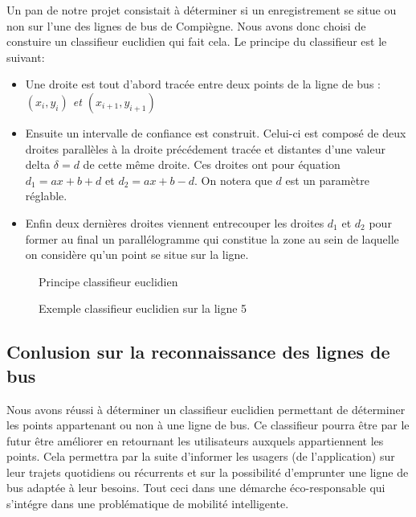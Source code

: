 \documentclass{article}
\begin{document}
Un pan de notre projet consistait à déterminer si un enregistrement se situe ou non sur l'une des lignes de bus de Compiègne.
Nous avons donc choisi de constuire un classifieur euclidien qui fait cela.
Le principe du classifieur est le suivant:
\begin{itemize}
    \item Une droite est tout d'abord tracée entre deux points de la ligne de bus : \textit{$(x_{i},y_{i})$ et $(x_{i+1},y_{i+1})$}
    \item Ensuite un intervalle de confiance est construit. Celui-ci est composé de deux droites parallèles à la droite précédement tracée et distantes d'une valeur delta $ \delta=d$ de cette même droite. Ces droites ont pour équation $d_{1}=ax+b+d$ et $d_{2}=ax+b-d$. On notera que $d$ est un paramètre réglable.
    \item Enfin deux dernières droites viennent entrecouper les droites $d_{1}$ et $d_{2}$ pour former au final un parallélogramme qui constitue la zone au sein de laquelle on considère qu'un point se situe sur la ligne.
\end{itemize}


\begin{figure}[!h]
  \centering{}
 \captionsetup{justification=centering}
    \caption{Principe classifieur euclidien}
\end{figure}

\begin{figure}[!h]
  \centering{}
 \captionsetup{justification=centering}
    \caption{Exemple classifieur euclidien sur la ligne 5}
\end{figure}

\subsection{Conlusion sur la reconnaissance des lignes de bus}

Nous avons réussi à déterminer un classifieur euclidien permettant de déterminer les points appartenant ou non à une ligne de bus. Ce classifieur pourra être par le futur être améliorer en retournant les utilisateurs auxquels appartiennent les points. Cela permettra par la suite d'informer les usagers (de l'application) sur leur trajets quotidiens ou récurrents et sur la possibilité d'emprunter une ligne de bus adaptée à leur besoins. Tout ceci dans une démarche éco-responsable qui s'intégre dans une problématique de mobilité intelligente.
\end{document}
